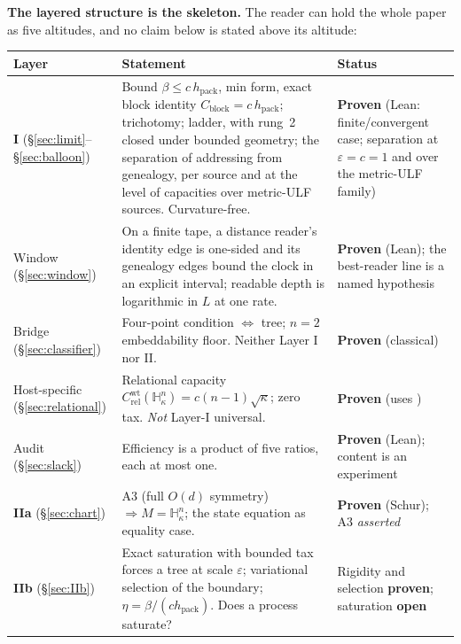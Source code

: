 \documentclass[11pt,reqno]{amsart}
\theoremstyle{plain}
\theoremstyle{definition}
\newcommand{\hpack}{h_{\mathrm{pack}}}
\newcommand{\Crel}{C_{\mathrm{rel}}}
\newcommand{\Cblock}{C_{\mathrm{block}}}
\newcommand{\Hk}{\mathbb{H}^n_\kappa}
\newcommand{\eps}{\varepsilon}
\begin{document}
\medskip
\noindent\textbf{The layered structure is the skeleton.} The reader can hold the whole paper as five altitudes, and no claim below is stated above its altitude:

\begin{center}\small
\begin{tabular}{@{}>{\raggedright\arraybackslash}p{2.1cm}>{\raggedright\arraybackslash}p{7.0cm}>{\raggedright\arraybackslash}p{3.6cm}@{}}
\toprule
\textbf{Layer} & \textbf{Statement} & \textbf{Status} \\
\midrule
\textbf{I} (\S\ref{sec:limit}--\S\ref{sec:balloon}) & Bound $\beta\le c\,\hpack$, min form, exact block identity $\Cblock=c\,\hpack$; trichotomy; ladder, with rung~2 closed under bounded geometry; the separation of addressing from genealogy, per source and at the level of capacities over metric-ULF sources. Curvature-free. & \textbf{Proven} (Lean: finite/convergent case; separation at $\eps=c=1$ and over the metric-ULF family) \\
Window (\S\ref{sec:window}) & On a finite tape, a distance reader's identity edge is one-sided and its genealogy edges bound the clock in an explicit interval; readable depth is logarithmic in $L$ at one rate. & \textbf{Proven} (Lean); the best-reader line is a named hypothesis \\
Bridge (\S\ref{sec:classifier}) & Four-point condition $\Leftrightarrow$ tree; $n=2$ embeddability floor. Neither Layer I nor II. & \textbf{Proven} (classical) \\
Host-specific (\S\ref{sec:relational}) & Relational capacity $\Crel^{\mathrm{wt}}(\Hk)=c(n-1)\sqrt\kappa$; zero tax. \emph{Not} Layer-I universal. & \textbf{Proven} (uses \cite{skenderi2026}) \\
Audit (\S\ref{sec:slack}) & Efficiency is a product of five ratios, each at most one. & \textbf{Proven} (Lean); content is an experiment \\
\textbf{IIa} (\S\ref{sec:chart}) & A3 (full $O(d)$ symmetry) $\Rightarrow M=\Hk$; the state equation as equality case. & \textbf{Proven} (Schur); A3 \emph{asserted} \\
\textbf{IIb} (\S\ref{sec:IIb}) & Exact saturation with bounded tax forces a tree at scale $\eps$; variational selection of the boundary; $\eta=\beta/(c\hpack)$. Does a process saturate? & Rigidity and selection \textbf{proven}; saturation \textbf{open} \\
\bottomrule
\end{tabular}
\end{center}
\end{document}
